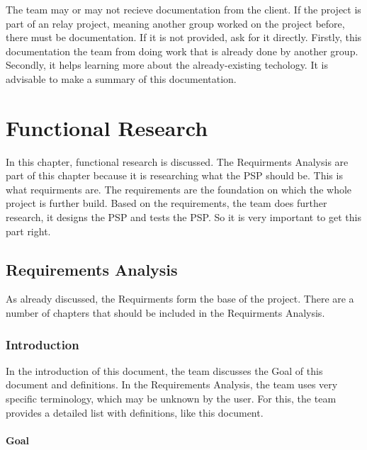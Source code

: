 \documentclass[10pt]{report}
\begin{document}
The team may or may not recieve documentation from the client. If the project is part of an relay project, meaning another group worked on the project before, there must be documentation. If it is not provided, ask for it directly. Firstly, this documentation the team from doing work that is already done by another group. Secondly, it helps learning more about the already-existing techology. It is advisable to make a summary of this documentation.

\newpage


\chapter{Functional Research}
\thispagestyle{fancy}

In this chapter, functional research is discussed. The Requirments Analysis are part of this chapter because it is researching what the PSP should be. This is what requirments are. The requirements are the foundation on which the whole project is further build. Based on the requirements, the team does further research, it designs the PSP and tests the PSP. So it is very important to get this part right.

\medskip
\minitoc

\newpage

\section{Requirements Analysis}

As already discussed, the Requirments form the base of the project. There are a number of chapters that should be included in the Requirments Analysis.

\subsection{Introduction}

In the introduction of this document, the team discusses the Goal of this document and definitions. In the Requirements Analysis, the team uses very specific terminology, which may be unknown by the user. For this, the team provides a detailed list with definitions, like this document.

\subsubsection{Goal}
\end{document}
